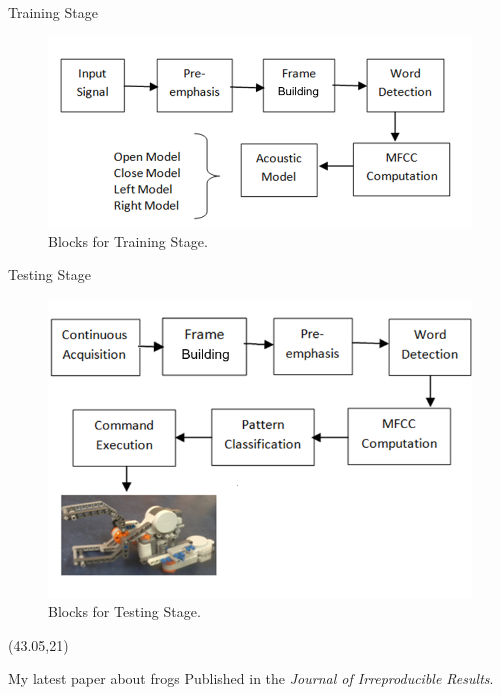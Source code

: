 \documentclass[final]{beamer}
\begin{document}
\begin{frame}{}
\begin{textblock}{39.5}
\begin{block}{Training Stage}
\begin{figure}[!ht]
\begin{center}
   \includegraphics[width=0.8\linewidth]{figs/1bloquesTraining}
\end{center}
   \caption{Blocks for Training Stage.}
\label{trainingBlocks}
\end{figure}
\end{block}

\begin{block}{Testing Stage}
\begin{figure}[!ht]
\begin{center}
   \includegraphics[width=0.8\linewidth]{figs/11bloquesTesting}
\end{center}
   \caption{Blocks for Testing Stage.}
\label{trainingBlocks}
\end{figure}
\end{block}


\end{textblock}

\begin{textblock}{39.5}(43.05,21)
\begin{block}{My latest paper about frogs}
Published in the \emph{Journal of Irreproducible Results}.
\end{block}


\end{textblock}
\end{frame}
\end{document}

